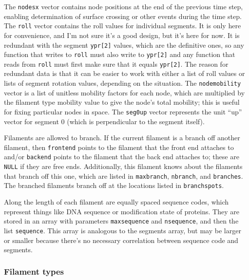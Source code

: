 \documentclass {scrbook}
\newcommand {\ttt} {\texttt}
\begin{document}
The \ttt{nodesx} vector contains node positions at the end of the previous time step, enabling determination of surface crossing or other events during the time step. The \ttt{roll} vector contains the roll values for individual segments. It is only here for convenience, and I'm not sure it's a good design, but it's here for now. It is redundant with the segment \ttt{ypr[2]} values, which are the definitive ones, so any function that writes to \ttt{roll} must also write to \ttt{ypr[2]} and any function that reads from \ttt{roll} must first make sure that it equals \ttt{ypr[2]}. The reason for redundant data is that it can be easier to work with either a list of roll values or lists of segment rotation values, depending on the situation. The \ttt{nodemobility} vector is a list of unitless mobility factors for each node, which are multiplied by the filament type mobility value to give the node's total mobility; this is useful for fixing particular nodes in space. The \ttt{seg0up} vector represents the unit ``up'' vector for segment 0 (which is perpendicular to the segment itself).

Filaments are allowed to branch. If the current filament is a branch off another filament, then \ttt{frontend} points to the filament that the front end attaches to and/or \ttt{backend} points to the filament that the back end attaches to; these are \ttt{NULL} if they are free ends. Additionally, this filament knows about the filaments that branch off this one, which are listed in \ttt{maxbranch}, \ttt{nbranch}, and \ttt{branches}. The branched filaments branch off at the locations listed in \ttt{branchspots}.

Along the length of each filament are equally spaced sequence codes, which represent things like DNA sequence or modification state of proteins. They are stored in an array with parameters \ttt{maxsequence} and \ttt{nsequence}, and then the list \ttt{sequence}. This array is analogous to the segments array, but may be larger or smaller because there's no necessary correlation between sequence code and segments.\\

\subsubsection{Filament types}
\end{document}
